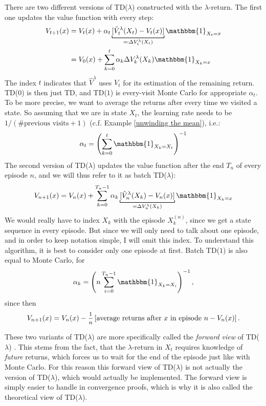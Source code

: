 There are two different versions of TD(\(\lambda\)) constructed with the \(\lambda\)-return. 
The first one updates the value function with every step:
\begin{align}
	V_{t+1}(x)&= V_t(x) + \alpha_t \underbracket[0.7pt]{[\hat{V}_t^\lambda(X_t)-V_t(x)]}_{
		\eqqcolon \Delta V^\lambda_t(X_t)
	}\mathbbm{1}_{X_t=x}
	\label{forward TD algorithm} \\
	&=V_0(x) + \sum_{k=0}^t \alpha_k\Delta V^\lambda_k(X_k) \mathbbm{1}_{X_k=x}\label{forward TD expanded}
\end{align}
The index \(t\) indicates that \(\hat{V}^\lambda\) uses \(V_t\) for its estimation of the remaining return. TD(\(0\)) is then just TD, and TD(\(1\)) is every-visit Monte Carlo for appropriate \(\alpha_t\). To be more precise, we want to average the returns after every time we visited a state. So assuming that we are in state \(X_t\), the learning rate needs to be \(1/(\#\text{previous visits}+1)\) (c.f. Example \ref{unwinding the mean}), i.e.:
\[
	\alpha_t=\left(\sum_{k=0}^{t}\mathbbm{1}_{X_k=X_t}\right)^{-1}
\]
The second version of TD(\(\lambda\)) updates the value function after the end \(T_n\) of every episode \(n\), and we will thus refer to it as batch TD(\(\lambda\)):
\begin{align}\label{forward batch TD}
	V_{n+1}(x)=V_n(x)+\sum_{k=0}^{T_n-1}\alpha_k \underbracket[0.7pt]{[\hat{V}_n^\lambda(X_{k})-V_n(x)]}_{=\Delta V_n^\lambda(X_{k})}\mathbbm{1}_{X_{k}=x}
\end{align}
We would really have to index \(X_k\) with the episode \(X_k^{(n)}\), since we get a state sequence in every episode. But since we will only need to talk about one episode, and in order to keep notation simple, I will omit this index. To understand this algorithm, it is best to consider only one episode at first. Batch TD(\(1\)) is also equal to Monte Carlo, for
\begin{align}\label{batch TD(1) learning rate}
	\alpha_k= \left(n\sum_{i=0}^{T_n-1}\mathbbm{1}_{X_{k}=X_i} \right)^{-1},
\end{align}
since then
\[
	V_{n+1}(x)=V_n(x)- \mfrac{1}{n}\left[\text{average returns after \(x\) in episode }n - V_n(x)\right].
\]

These two variants of TD(\(\lambda\)) are more specifically called the \emph{forward view} of TD(\(\lambda\)) \parencite{suttonReinforcementLearningIntroduction1998}. This stems from the fact, that the \(\lambda\)-return in \(X_t\) requires knowledge of \emph{future} returns, which forces us to wait for the end of the episode just like with Monte Carlo. For this reason this forward view of TD(\(\lambda\)) is not actually the version of TD(\(\lambda\)), which would actually be implemented. The forward view is simply easier to handle in convergence proofs, which is why it is also called the theoretical view of TD(\(\lambda\)). 

